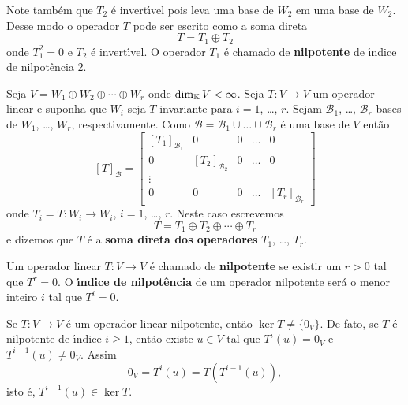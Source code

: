 Note tamb\'em que $T_2$ \'e invert{\'\i}vel pois leva uma base de $W_2$ em uma base de $W_2$. Desse modo o operador $T$ pode ser escrito como a soma direta
\[
	T = T_1 \oplus T_2
\]
onde $T_1^2 = 0$ e $T_2$ \'e invert{\'\i}vel. O operador $T_1$ \'e chamado de \textbf{nilpotente} de {\'\i}ndice de nilpot\^encia 2.

\begin{definicao}
	Seja $V = W_1 \oplus W_2 \oplus \cdots \oplus W_r$ onde $\dim_{\mathbb{K}} V < \infty$. Seja $T : V \to V$ um operador linear e suponha que $W_i$ seja $T$-invariante para $i = 1$, \dots, $r$. Sejam $\mathcal{B}_1$, \dots, $\mathcal{B}_r$ bases de $W_1$, \dots, $W_r$, respectivamente. Como $\mathcal{B} = \mathcal{B}_1 \cup \dots \cup \mathcal{B}_r $ \'e uma base de $V$ ent\~ao
	\[
		[T]_\mathcal{B} = \begin{bmatrix}
		[T_1]_{\mathcal{B}_1} & 0 & 0 & \dots & 0\\
		0 & [T_2]_{\mathcal{B}_2} & 0 & \dots & 0\\
		\vdots\\
		0 & 0 & 0 & \dots & [T_r]_{\mathcal{B}_r}
	\end{bmatrix}
	\]
	onde $T_i = T : W_i \to W_i$, $i = 1$, \dots, $r$. Neste caso escrevemos
	\[
		T = T_1 \oplus T_2 \oplus \cdots \oplus T_r
	\]
	e dizemos que $T$ \'e a \textbf{soma direta dos operadores} $T_1$, \dots, $T_r$.
\end{definicao}

\begin{definicao}
	Um operador linear $T : V \to V$ \'e chamado de \textbf{nilpotente} se existir um $r > 0$ tal que $T^r = 0$. O \textbf{{\'\i}ndice de nilpot\^encia} de um operador nilpotente ser\'a o menor inteiro $i$ tal que $T^i = 0$.
\end{definicao}

\begin{observacao}
	Se $T : V \to V$ \'e um operador linear nilpotente, ent\~ao $\ker T \ne \{0_V\}$. De fato, se $T$ \'e nilpotente de {\'\i}ndice $i \ge 1$, ent\~ao existe $u \in V$ tal que $T^i(u) = 0_V$ e $T^{i - 1}(u) \ne 0_V$. Assim
	\[
		0_V = T^i(u) = T(T^{i - 1}(u)),
	\]
	isto \'e, $T^{i - 1}(u) \in \ker T$.
\end{observacao}

